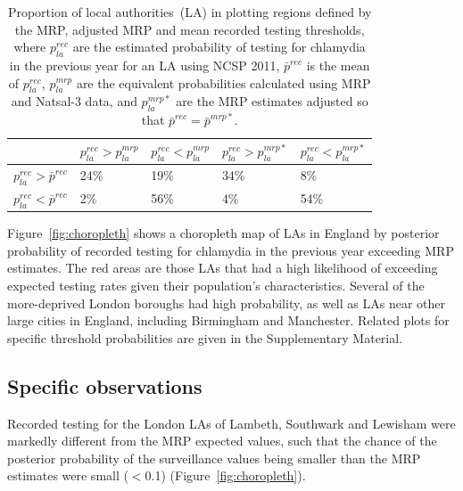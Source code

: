 \documentclass[fleqn,10pt]{wlscirep}
\begin{document}
\begin{table}[!ht]
\renewcommand*{\arraystretch}{1.5}
\centering
\begin{tabular}{|l|l|l|l|l|}
\hline 
 & $p_{la}^{rec} > p_{la}^{mrp}$
 & $p_{la}^{rec}< p_{la}^{mrp}$
 & $p_{la}^{rec} > p_{la}^{mrp*}$
 & $p_{la}^{rec}< p_{la}^{mrp*}$ \\
\hline
$p_{la}^{rec} > \bar{p}^{rec}$ & 24\% & 19\% & 34\% & 8\%\\
\hline
$p_{la}^{rec} < \bar{p}^{rec}$ & 2\% & 56\% & 4\% & 54\%\\
\hline
\end{tabular}
\caption{\label{tab:regions} Proportion of local authorities~(LA) in plotting regions defined by the MRP, adjusted MRP and mean recorded testing thresholds, where $p_{la}^{rec}$ are the estimated probability of testing for chlamydia in the previous year for an LA using NCSP 2011, $\bar{p}^{rec}$ is the mean of $p_{la}^{rec}$, $p_{la}^{mrp}$ are the equivalent probabilities calculated using MRP and Natsal-3 data, and $p_{la}^{mrp*}$ are the MRP estimates adjusted so that $\bar{p}^{rec} = \bar{p}^{mrp*}$.}
\end{table}

Figure~\ref{fig:choropleth} shows a choropleth map of LAs in England by posterior probability of recorded testing for chlamydia in the previous year exceeding MRP estimates. The red areas are those LAs that had a high likelihood of exceeding expected testing rates given their population’s characteristics. Several of the more-deprived London boroughs had high probability, as well as LAs near other large cities in England, including Birmingham and Manchester. Related plots for specific threshold probabilities are given in the Supplementary Material.

\subsection*{Specific observations}
Recorded testing for the London LAs of Lambeth, Southwark and Lewisham were markedly different from the MRP expected values, such that the chance of the posterior probability of the surveillance values being smaller than the MRP estimates were small ($<$0.1) (Figure~\ref{fig:choropleth}).
\end{document}
